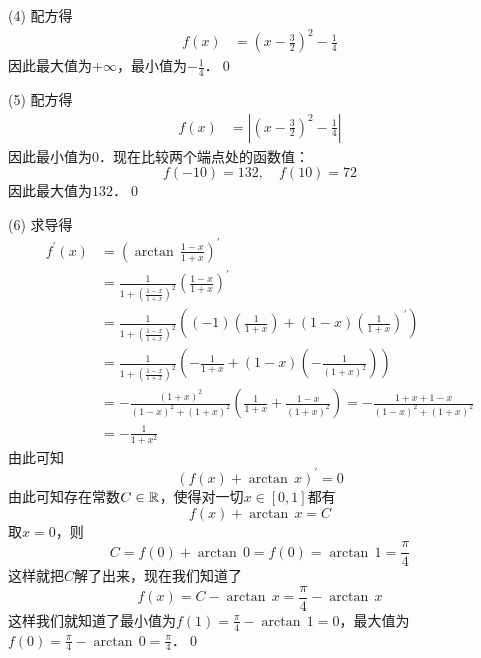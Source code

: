 (4) \solve 配方得
\begin{align}
    f(x) &= (x - \frac{3}{2})^2 - \frac{1}{4}
\end{align}
因此最大值为$+\infty$，最小值为$-\displaystyle\frac{1}{4}$．\qed\bigskip

(5) \solve 配方得
\begin{align}
    f(x) &= \left| \left(x - \frac{3}{2}\right)^2 - \frac{1}{4} \right|
\end{align}
因此最小值为$0$．现在比较两个端点处的函数值：
\begin{equation}
    f(-10) = 132, \quad f(10) = 72
\end{equation}
因此最大值为$132$．\qed\bigskip

(6) \solve 求导得
\begin{align}
    f^{\prime}(x) &= \left(\arctan \, \displaystyle\frac{1-x}{1+x}\right)^{\prime} \\
    &= \displaystyle\frac{1}{1+\left(\displaystyle\frac{1-x}{1+x}\right)^2} \left(\displaystyle\frac{1-x}{1+x}\right)^{\prime} \\
    &= \displaystyle\frac{1}{1+\left(\displaystyle\frac{1-x}{1+x}\right)^2} \left(\left(-1\right)\left(\frac{1}{1+x}\right)+\left(1-x\right)\left(\displaystyle\frac{1}{1+x}\right)^{\prime}\right) \\
    &= \displaystyle\frac{1}{1+\left(\displaystyle\frac{1-x}{1+x}\right)^2} \left(-\displaystyle\frac{1}{1+x}+\left(1-x\right)\left(-\displaystyle\frac{1}{\left(1+x\right)^2}\right)\right) \\
    &= -\frac{\left(1+x\right)^2}{\left(1-x\right)^2+\left(1+x\right)^2} \left(\frac{1}{1+x} + \frac{1-x}{\left(1+x\right)^2}\right) = - \frac{1+x+1-x}{\left(1-x\right)^2+\left(1+x\right)^2} \\
    &= -\frac{1}{1+x^2}
\end{align}
由此可知
\begin{equation}
    \left(f(x) + \arctan \, x\right)^{\prime} = 0
\end{equation}
由此可知存在常数$C \in \mathbb{R}$，使得对一切$x \in [0,1]$都有
\begin{equation}
    f(x) + \arctan \, x = C
\end{equation}
取$x = 0$，则
\begin{equation}
    C = f(0) + \arctan \, 0 = f(0) = \arctan \, 1 = \frac{\pi}{4}
\end{equation}
这样就把$C$解了出来，现在我们知道了
\begin{equation}
    f(x) = C - \arctan \, x = \frac{\pi}{4} - \arctan \, x
\end{equation}
这样我们就知道了最小值为$f(1) = \displaystyle\frac{\pi}{4} - \arctan \, 1 = 0$，最大值为$f(0) = \displaystyle\frac{\pi}{4} - \arctan \, 0 = \displaystyle\frac{\pi}{4}$．\qed\bigskip

